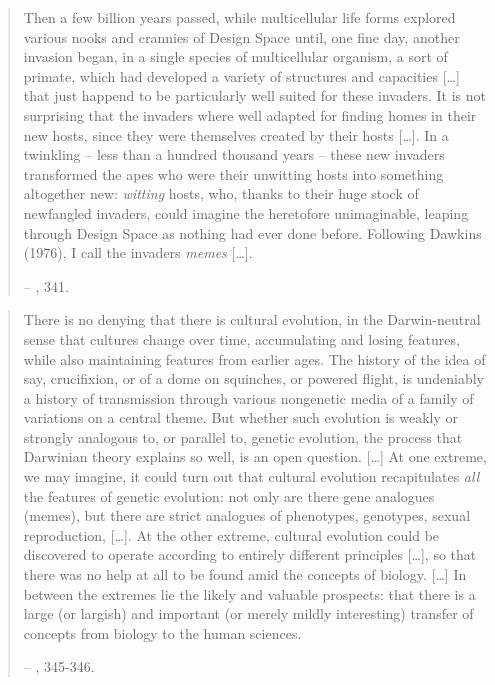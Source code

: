 \documentclass[openany,twoside,twocolumn]{book}
\begin{document}
\begin{quote}
Then a few billion years passed, while multicellular life forms explored
various nooks and crannies of Design Space until, one fine day, another
invasion began, in a single species of multicellular organism, a sort of
primate, which had developed a variety of structures and capacities
{[}\ldots{}{]} that just happend to be particularly well suited for
these invaders. It is not surprising that the invaders where well
adapted for finding homes in their new hosts, since they were themselves
created by their hosts {[}\ldots{}{]}. In a twinkling -- less than a
hundred thousand years -- these new invaders transformed the apes who
were their unwitting hosts into something altogether new: \emph{witting}
hosts, who, thanks to their huge stock of newfangled invaders, could
imagine the heretofore unimaginable, leaping through Design Space as
nothing had ever done before. Following Dawkins (1976), I call the
invaders \emph{memes} {[}\ldots{}{]}.

-- \textcite{dennett_darwins_1995}, 341.
\end{quote}

\begin{quote}
There is no denying that there is cultural evolution, in the
Darwin-neutral sense that cultures change over time, accumulating and
losing features, while also maintaining features from earlier ages. The
history of the idea of say, crucifixion, or of a dome on squinches, or
powered flight, is undeniably a history of transmission through various
nongenetic media of a family of variations on a central theme. But
whether such evolution is weakly or strongly analogous to, or parallel
to, genetic evolution, the process that Darwinian theory explains so
well, is an open question. {[}\ldots{}{]} At one extreme, we may
imagine, it could turn out that cultural evolution recapitulates
\emph{all} the features of genetic evolution: not only are there gene
analogues (memes), but there are strict analogues of phenotypes,
genotypes, sexual reproduction, {[}\ldots{}{]}. At the other extreme,
cultural evolution could be discovered to operate according to entirely
different principles {[}\ldots{}{]}, so that there was no help at all to
be found amid the concepts of biology. {[}\ldots{}{]} In between the
extremes lie the likely and valuable prospects: that there is a large
(or largish) and important (or merely mildly interesting) transfer of
concepts from biology to the human sciences.

-- \textcite{dennett_darwins_1995}, 345-346.
\end{quote}
\end{document}
